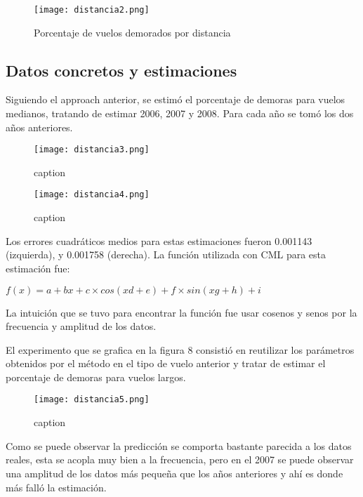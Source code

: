 \begin{figure}[!ht]
\centering
\texttt{[image: distancia2.png]}
\caption{Porcentaje de vuelos demorados por distancia}
\label{distancia-2}
\end{figure}

\subsection{Datos concretos y estimaciones}

Siguiendo el approach anterior, se estimó el porcentaje de demoras para vuelos medianos, tratando de estimar 2006, 2007 y 2008. Para cada año se tomó los dos años anteriores.

\begin{figure}[!ht]
\centering
\texttt{[image: distancia3.png]}
\caption{caption}
\label{distancia-3}
\end{figure}

\begin{figure}[!ht]
\centering
\texttt{[image: distancia4.png]}
\caption{caption}
\label{distancia-4}
\end{figure}

Los errores cuadráticos medios para estas estimaciones fueron 0.001143 (izquierda), y 0.001758 (derecha). La función utilizada con CML para esta estimación fue:

$f(x) = a + bx + c \times cos(xd + e) + f \times sin(xg + h) + i$

La intuición que se tuvo para encontrar la función fue usar cosenos y senos por la frecuencia y amplitud de los datos.

El experimento que se grafica en la figura 8 consistió en reutilizar los parámetros obtenidos por el método en el tipo de vuelo anterior y tratar de estimar el porcentaje de demoras para vuelos largos.

\begin{figure}[!ht]
\centering
\texttt{[image: distancia5.png]}
\caption{caption}
\label{distancia-5}
\end{figure}

Como se puede observar la predicción se comporta bastante parecida a los datos reales, esta se acopla muy bien a la frecuencia, pero en el 2007 se puede observar una amplitud de los datos más pequeña que los años anteriores y ahí es donde más falló la estimación.